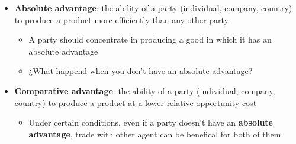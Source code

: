 \documentclass[
  ignorenonframetext,
]{beamer}
\providecommand{\tightlist}{%
  \setlength{\itemsep}{0pt}\setlength{\parskip}{0pt}}\usepackage{longtable,booktabs,array}
\begin{document}
\begin{frame}{}
\label{section-2}
\begin{itemize}
\item
  \textbf{Absolute advantage}: the ability of a party (individual,
  company, country) to produce a product more efficiently than any other
  party

  \begin{itemize}
  \item
    A party should concentrate in producing a good in which it has an
    absolute advantage
  \item
    ¿What happend when you don't have an absolute advantage?
  \end{itemize}
\item
  \textbf{Comparative advantage}: the ability of a party (individual,
  company, country) to produce a product at a lower relative opportunity
  cost

  \begin{itemize}
  \tightlist
  \item
    Under certain conditions, even if a party doesn't have an
    \textbf{absolute advantage}, trade with other agent can be benefical
    for both of them
  \end{itemize}
\end{itemize}
\end{frame}
\end{document}

